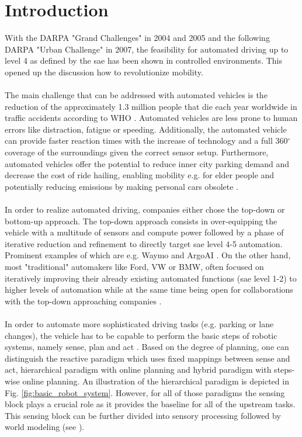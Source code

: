 \chapter{Introduction}
\label{ch:introduction}
With the DARPA "Grand Challenges" \cite{thrun2006stanley} in 2004 and 2005 and the following DARPA "Urban Challenge" \cite{Urmson-2007-9708} in 2007, the feasibility for automated driving up to level 4 as defined by the \gls{sae} \cite{SAE2017} has been shown in controlled environments. This opened up the discussion how to revolutionize mobility. 
\\\\
The main challenge that can be addressed with automated vehicles is the reduction of the approximately 1.3 million people that die each year worldwide in traffic accidents according to WHO \cite{world2018global}. Automated vehicles are less prone to human errors like distraction, fatigue or speeding. Additionally, the automated vehicle can provide faster reaction times with the increase of technology and a full 360$^{\circ}$ coverage of the surroundings given the correct sensor setup. Furthermore, automated vehicles offer the potential to reduce inner city parking demand \cite{zhang2020impacts} and decrease the cost of ride hailing, enabling mobility e.g. for elder people and potentially reducing emissions by making personal cars obsolete \cite{severino2021autonomous}.  
\\\\
In order to realize automated driving, companies either chose the top-down or bottom-up approach. The top-down approach consists in over-equipping the vehicle with a multitude of sensors and compute power followed by a phase of iterative reduction and refinement to directly target \gls{sae} level 4-5 automation. Prominent examples of which are e.g. Waymo \cite{sun2020scalability} and ArgoAI \cite{chang2019argoverse}. On the other hand, most "traditional" automakers like Ford, VW or BMW, often focused on iteratively improving their already existing automated functions (\gls{sae} level 1-2) to higher levels of automation while at the same time being open for collaborations with the top-down approaching companies \cite{fordargovw2020}.
\\\\
In order to automate more sophisticated driving tasks (e.g. parking or lane changes), the vehicle has to be capable to perform the basic steps of robotic systems, namely sense, plan and act \cite{arkin1998behavior}. Based on the degree of planning, one can distinguish the reactive paradigm which uses fixed mappings between sense and act, hierarchical paradigm with online planning and hybrid paradigm with steps-wise online planning. An illustration of the hierarchical paradigm is depicted in Fig. \ref{fig:basic_robot_system}. However, for all of those paradigms the sensing block plays a crucial role as it provides the baseline for all of the upstream tasks. This sensing block can be further divided into sensory processing followed by world modeling (see \cite{arkin1998behavior}).
